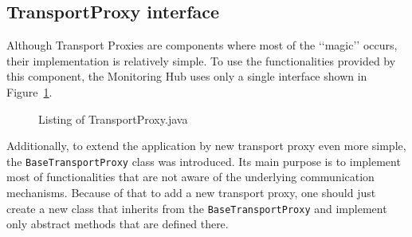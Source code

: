 \subsection{TransportProxy interface}
\label{subs:TransportProxyInterface}

Although Transport Proxies are components where most of the \lq\lq{}magic\rq\rq{} occurs, their implementation is relatively simple. To use the functionalities provided by this component, the Monitoring Hub uses only a single interface shown in Figure~\ref{fig:transport_proxy}.

\begin{figure}[ht]
  \centering
  
  \caption{Listing of TransportProxy.java}
  \label{fig:transport_proxy}
\end{figure} 

Additionally, to extend the application by new transport proxy even more simple, the \texttt{BaseTransportProxy} class was introduced. Its main purpose is to implement most of functionalities that are not aware of the underlying communication mechanisms. Because of that to add a new transport proxy, one should just create a new class that inherits from the \texttt{BaseTransportProxy} and implement only abstract methods that are defined there.
